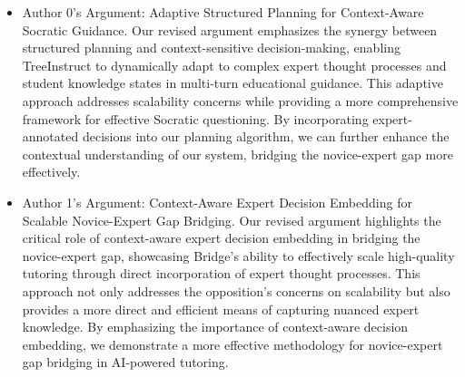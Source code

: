 \begin{enumerate}
\begin{enumerate}
        \begin{itemize}
            \item Author 0's Argument: Adaptive Structured Planning for Context-Aware Socratic Guidance. Our revised argument emphasizes the synergy between structured planning and context-sensitive decision-making, enabling TreeInstruct to dynamically adapt to complex expert thought processes and student knowledge states in multi-turn educational guidance. This adaptive approach addresses scalability concerns while providing a more comprehensive framework for effective Socratic questioning. By incorporating expert-annotated decisions into our planning algorithm, we can further enhance the contextual understanding of our system, bridging the novice-expert gap more effectively.
		\item Author 1's Argument: Context-Aware Expert Decision Embedding for Scalable Novice-Expert Gap Bridging. Our revised argument highlights the critical role of context-aware expert decision embedding in bridging the novice-expert gap, showcasing Bridge's ability to effectively scale high-quality tutoring through direct incorporation of expert thought processes. This approach not only addresses the opposition's concerns on scalability but also provides a more direct and efficient means of capturing nuanced expert knowledge. By emphasizing the importance of context-aware decision embedding, we demonstrate a more effective methodology for novice-expert gap bridging in AI-powered tutoring.
        \end{itemize}
    \end{enumerate}
\fi
\end{enumerate}